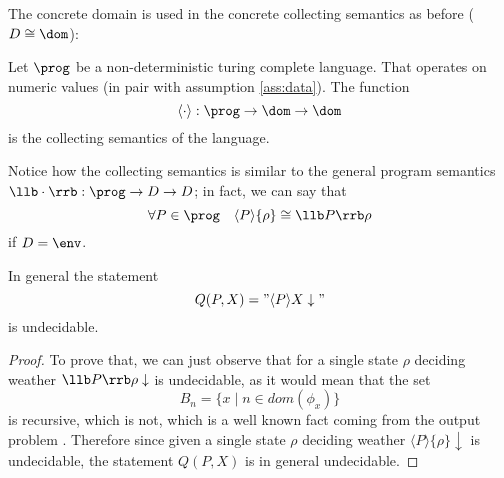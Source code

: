 The concrete domain is used in the concrete collecting semantics as
before (\(D \cong \dom\)):

\begin{definition}\label{def:collecting}
  Let \(\prog\) be a non-deterministic turing complete language. That
  operates on numeric values (in pair with assumption
  \ref{ass:data}). The function \[\langle \cdot \rangle : \prog \to
  \dom \to \dom\] is the collecting semantics of the language.
\end{definition}

Notice how the collecting semantics is similar to the general program
semantics \(\llb \cdot \rrb : \prog \to D \to D\); in fact, we can say
that \[\forall P \in \prog \quad \langle P \rangle \{\rho\} \cong \llb
P \rrb \rho\]
if \(D = \env\).

\begin{theorem}\label{th:collectingundec}
  In general the statement \[Q(P,X) = "\langle P \rangle X
  \downarrow"\] is undecidable.
\end{theorem}

\begin{proof}
  To prove that, we can just observe that for a single state \(\rho\)
  deciding weather \(\llb P \rrb \rho \downarrow\) is undecidable, as
  it would mean that the set \[B_n = \{x \mid n \in dom(\phi_x)\}\] is
  recursive, which is not, which is a well known fact coming from the
  output problem \cite[p.~104]{cutland1980computability}. Therefore
  since given a single state \(\rho\) deciding weather \(\langle P
  \rangle\{\rho\}\downarrow\) is undecidable, the statement \(Q(P,X)\)
  is in general undecidable.
\end{proof}



